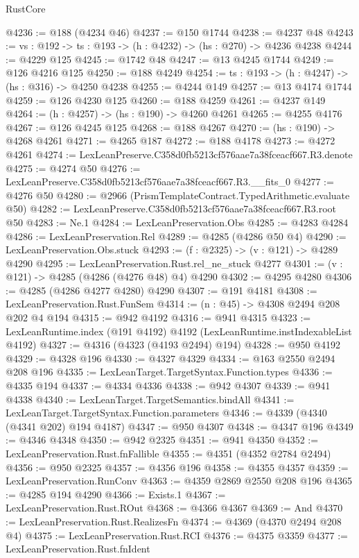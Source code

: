 \begin{lexlean}{RustCore}
\begin{coremodule}
@4236 := @188 (@4234 @46)
@4237 := @150 @1744
@4238 := @4237 @48
@4243 := {vs : @192} -> {ts : @193} -> (h : @4232) -> (hs : @270) -> @4236 @4238
@4244 := @4229 @125
@4245 := @1742 @48
@4247 := @13 @4245 @1744
@4249 := @126 @4216 @125
@4250 := @188 @4249
@4254 := {ts : @193} -> (h : @4247) -> (hs : @316) -> @4250 @4238
@4255 := @4244 @149
@4257 := @13 @4174 @1744
@4259 := @126 @4230 @125
@4260 := @188 @4259
@4261 := @4237 @149
@4264 := (h : @4257) -> (hs : @190) -> @4260 @4261
@4265 := @4255 @4176
@4267 := @126 @4245 @125
@4268 := @188 @4267
@4270 := (hs : @190) -> @4268 @4261
@4271 := @4265 @187
@4272 := @188 @4178
@4273 := @4272 @4261
@4274 := LexLeanPreserve.C358d0fb5213cf576aae7a38fceacf667.R3.denote
@4275 := @4274 @50
@4276 := LexLeanPreserve.C358d0fb5213cf576aae7a38fceacf667.R3.__fits_0
@4277 := @4276 @50
@4280 := @2966 (PrismTemplateContract.TypedArithmetic.evaluate @50)
@4282 := LexLeanPreserve.C358d0fb5213cf576aae7a38fceacf667.R3.root @50
@4283 := Ne.{1}
@4284 := LexLeanPreservation.Obs
@4285 := @4283 @4284
@4286 := LexLeanPreservation.Rel
@4289 := @4285 (@4286 @50 @4)
@4290 := LexLeanPreservation.Obs.stuck
@4293 := (f : @2325) -> (v : @121) -> @4289 @4290
@4295 := LexLeanPreservation.Rust.rel_ne_stuck @4277
@4301 := (v : @121) -> @4285 (@4286 (@4276 @48) @4) @4290
@4302 := @4295 @4280
@4306 := @4285 (@4286 @4277 @4280) @4290
@4307 := @191 @4181
@4308 := LexLeanPreservation.Rust.FunSem
@4314 := (n : @45) -> @4308 @2494 @208 @202 @4 @194
@4315 := @942 @4192
@4316 := @941 @4315
@4323 := LexLeanRuntime.index (@191 @4192) @4192 (LexLeanRuntime.instIndexableList @4192)
@4327 := @4316 (@4323 (@4193 @2494) @194)
@4328 := @950 @4192
@4329 := @4328 @196
@4330 := @4327 @4329
@4334 := @163 @2550 @2494 @208 @196
@4335 := LexLeanTarget.TargetSyntax.Function.types
@4336 := @4335 @194
@4337 := @4334 @4336
@4338 := @942 @4307
@4339 := @941 @4338
@4340 := LexLeanTarget.TargetSemantics.bindAll
@4341 := LexLeanTarget.TargetSyntax.Function.parameters
@4346 := @4339 (@4340 (@4341 @202) @194 @4187)
@4347 := @950 @4307
@4348 := @4347 @196
@4349 := @4346 @4348
@4350 := @942 @2325
@4351 := @941 @4350
@4352 := LexLeanPreservation.Rust.fnFallible
@4355 := @4351 (@4352 @2784 @2494)
@4356 := @950 @2325
@4357 := @4356 @196
@4358 := @4355 @4357
@4359 := LexLeanPreservation.RunConv
@4363 := @4359 @2869 @2550 @208 @196
@4365 := @4285 @194 @4290
@4366 := Exists.{1}
@4367 := LexLeanPreservation.Rust.ROut
@4368 := @4366 @4367
@4369 := And
@4370 := LexLeanPreservation.Rust.RealizesFn
@4374 := @4369 (@4370 @2494 @208 @4)
@4375 := LexLeanPreservation.Rust.RCI
@4376 := @4375 @3359
@4377 := LexLeanPreservation.Rust.fnIdent

\end{coremodule}
\end{lexlean}
